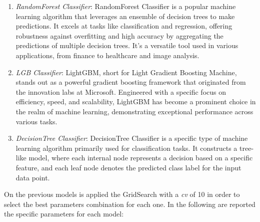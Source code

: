 \documentclass[12pt,a4paper,openright,twoside]{book}
\begin{document}
\begin{enumerate}

    \item \emph{RandomForest Classifier}: RandomForest Classifier is a popular machine learning algorithm that leverages an ensemble of decision trees to make predictions. It excels at tasks like classification and regression, offering robustness against overfitting and high accuracy by aggregating the predictions of multiple decision trees. It's a versatile tool used in various applications, from finance to healthcare and image analysis.
    
    \item \emph{LGB Classifier}: LightGBM, short for Light Gradient Boosting Machine, stands out as a powerful gradient boosting framework that originated from the innovation labs at Microsoft. Engineered with a specific focus on efficiency, speed, and scalability, LightGBM has become a prominent choice in the realm of machine learning, demonstrating exceptional performance across various tasks.
    
    \item \emph{DecisionTree Classifier}: DecisionTree Classifier is a specific type of machine learning algorithm primarily used for classification tasks. It constructs a tree-like model, where each internal node represents a decision based on a specific feature, and each leaf node denotes the predicted class label for the input data point.

\end{enumerate}

On the previous models is applied the GridSearch with a \emph{cv} of 10 in order to select the best parameters combination for each one. In the following are reported the specific parameters for each model:
\end{document}
